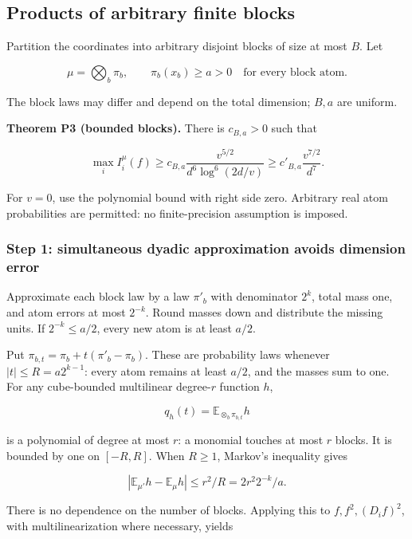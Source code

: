 \subsection{Products of arbitrary finite
blocks}\label{proof:positive_structure:products-of-arbitrary-finite-blocks}

Partition the coordinates into arbitrary disjoint blocks of size at most
\(B\). Let

\[
\mu=\bigotimes_b\pi_b,
\qquad\pi_b(x_b)\ge a>0
\quad\text{for every block atom.}
\tag{BP}
\]

The block laws may differ and depend on the total dimension; \(B,a\) are
uniform.

\textbf{Theorem P3 (bounded blocks).} There is \(c_{B,a}>0\) such that

\[
\boxed{\max_i I_i^\mu(f)
\ge c_{B,a}\frac{v^{5/2}}{d^6\log^6(2d/v)}
\ge c'_{B,a}\frac{v^{7/2}}{d^7}.}
\tag{P3}
\]

For \(v=0\), use the polynomial bound with right side zero. Arbitrary
real atom probabilities are permitted: no finite-precision assumption is
imposed.

\subsubsection{Step 1: simultaneous dyadic approximation avoids
dimension
error}\label{proof:positive_structure:step-1-simultaneous-dyadic-approximation-avoids-dimension-error}

Approximate each block law by a law \(\pi'_b\) with denominator \(2^k\),
total mass one, and atom errors at most \(2^{-k}\). Round masses down
and distribute the missing units. If \(2^{-k}\le a/2\), every new atom
is at least \(a/2\).

Put \(\pi_{b,t}=\pi_b+t(\pi'_b-\pi_b)\). These are probability laws whenever
\(|t|\le R=a2^{k-1}\): every atom remains at least \(a/2\), and the
masses sum to one. For any cube-bounded multilinear degree-\(r\)
function \(h\),

\[
q_h(t)=\mathbb E_{\otimes_b\pi_{b,t}}h
\]

is a polynomial of degree at most \(r\): a monomial touches at most
\(r\) blocks. It is bounded by one on \([-R,R]\). When \(R\ge 1\),
Markov's inequality gives

\[
|\mathbb E_{\mu'}h-\mathbb{E}_\mu h|
\le r^2/R=2r^2 2^{-k}/a.
\tag{3.1}
\]

There is no dependence on the number of blocks. Applying this to
\(f,f^2,(D_i f)^2\), with multilinearization where necessary, yields

